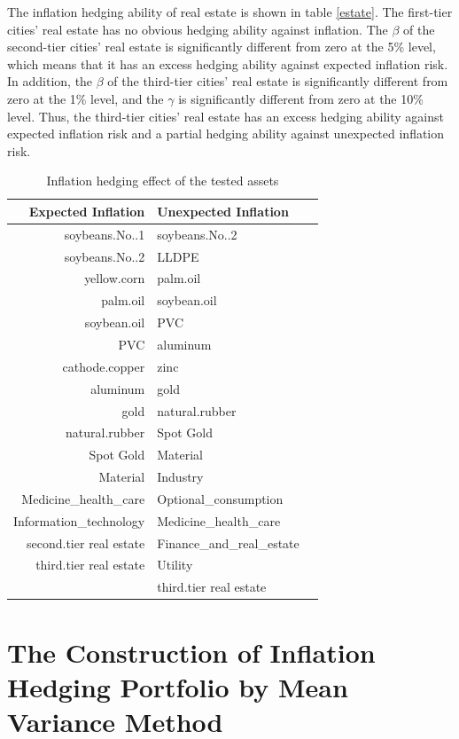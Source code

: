 \documentclass[12pt]{article}
\begin{document}
The inflation hedging ability of real estate is shown in table \ref{estate}. The first-tier cities' real estate has no obvious hedging ability against inflation. The $\beta$ of the second-tier cities' real estate is significantly different from zero at the 5\% level, which means that it has an excess hedging ability against expected inflation risk. In addition, the $\beta$ of the third-tier cities' real estate is significantly different from zero at the 1\% level, and the $\gamma$ is significantly different from zero at the 10\% level. Thus, the third-tier cities' real estate has an excess hedging ability against expected inflation risk and a partial hedging ability against unexpected inflation risk.\\
\begin{table}[ht] \centering
\caption{Inflation hedging effect of the tested assets}
\label{effect}
\begin{tabular}{rll}
  \hline
  Expected Inflation & Unexpected Inflation\\ 
  \hline
  soybeans.No..1 & soybeans.No..2 \\ 
  soybeans.No..2 & LLDPE \\ 
  yellow.corn & palm.oil \\ 
  palm.oil & soybean.oil \\ 
  soybean.oil & PVC \\
  PVC & aluminum \\ 
  cathode.copper & zinc \\ 
  aluminum & gold \\ 
  gold & natural.rubber \\ 
  natural.rubber & Spot Gold \\ 
  Spot Gold & Material \\ 
  Material & Industry \\ 
  Medicine\_health\_care & Optional\_consumption \\
  Information\_technology & Medicine\_health\_care \\ 
  second.tier real estate & Finance\_and\_real\_estate \\ 
  third.tier real estate & Utility \\ 
  & third.tier real estate\\ 
   \hline
\end{tabular}
\end{table}

\newpage
\section{The Construction of Inflation Hedging Portfolio by Mean Variance Method}
\end{document}
